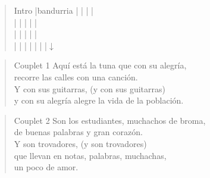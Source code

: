 \begin{verse}{Intro}
|bandurria |  \hspace{3em} | \hspace{4em} | \hspace{2em}  |\\
| \hspace{3.3em} | \hspace{4em} | \hspace{4em} | \hspace{2em}  |\\
| \hspace{3.25em} | \hspace{4em} | \hspace{4em} | \hspace{2em}  |\\
| \hspace{3.3em} | \hspace{4em} | \hspace{4em} | \hspace{2em}  |  \hspace{3em} | \hspace{4em} |$\downarrow$\\
\end{verse}

\begin{verse}{Couplet 1}
Aqu\'{i} est\'{a} la tuna que con su alegr\'{i}a,\\
recorre las calles con una canci\'{o}n.\\
\chord{}Y con sus guitarras, (y con sus guitarras)\\
y con su alegr\'{i}a alegre la vida de la poblaci\'{o}n.
\end{verse}

\begin{verse}{Couplet 2}
Son los estudiantes, muchachos de broma,\\
de buenas palabras y gran coraz\'{o}n.\\
\chord{}Y son trovadores, (y son trovadores)\\
\chord{}que llevan en notas, palabras, muchachas,\\
un poco de amor.\hspace{1em} \hspace{2em}
\end{verse}

